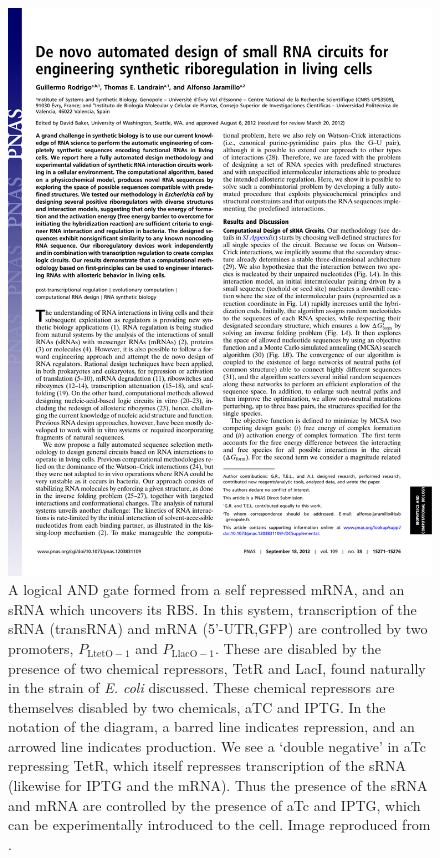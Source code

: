 \documentclass[10pt,journal]{./IEEE_latex_class/IEEEtran}
\begin{document}
\begin{figure}[t!]
\centering
\includegraphics[trim = 30 600 30 0,page=4,clip = true]{pnas1203831109.pdf}
\caption{A logical AND gate formed from a self repressed mRNA, and an sRNA which uncovers its RBS. In this system, transcription of the sRNA (transRNA) and mRNA (5'-UTR,GFP) are controlled by two promoters, $P_{\mathrm{LtetO-1}}$ and $P_\mathrm{LlacO-1}$. These are disabled by the presence of two chemical repressors, TetR and LacI, found naturally in the strain of \textit{E. coli} discussed. These chemical repressors are themselves disabled by two chemicals, aTC and IPTG. In the notation of the diagram, a barred line indicates repression, and an arrowed line indicates production. We see a `double negative' in aTc repressing TetR, which itself represses transcription of the sRNA (likewise for IPTG and the mRNA). Thus the presence of the sRNA and mRNA are controlled by the presence of aTc and IPTG, which can be experimentally introduced to the cell.  Image reproduced from \cite{Rodrigo2012}.}
\label{ANDGate}
\end{figure}
\setcounter{figure}{0}
\end{document}
